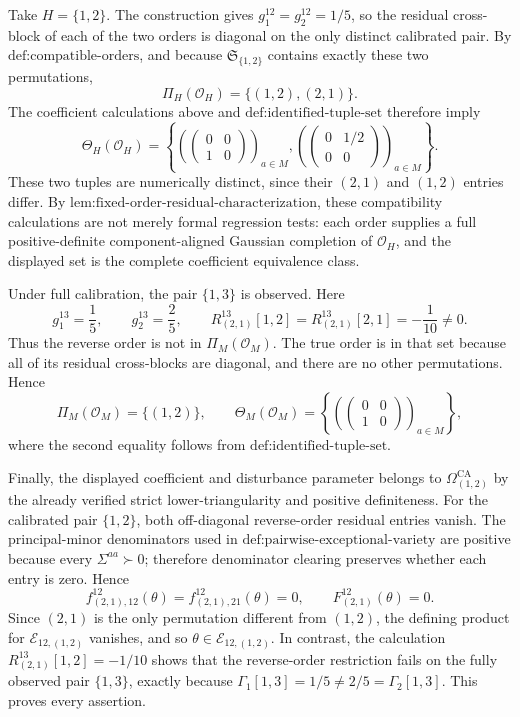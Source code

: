 Take \(H=\{1,2\}\).  The construction gives
\(g_1^{12}=g_2^{12}=1/5\), so the residual cross-block of each of the two orders is diagonal on the only distinct calibrated pair.  By \(\text{def:compatible-orders}\), and because \(\mathfrak S_{\{1,2\}}\) contains exactly these two permutations,
\[
\Pi_H(\mathcal O_H)=\{(1,2),(2,1)\}.
\]
The coefficient calculations above and \(\text{def:identified-tuple-set}\) therefore imply
\[
\Theta_H(\mathcal O_H)
=\left\{
\left(\begin{pmatrix}0&0\\1&0\end{pmatrix}\right)_{a\in M},
\left(\begin{pmatrix}0&1/2\\0&0\end{pmatrix}\right)_{a\in M}
\right\}.
\]
These two tuples are numerically distinct, since their \((2,1)\) and \((1,2)\) entries differ.  By \(\text{lem:fixed-order-residual-characterization}\), these compatibility calculations are not merely formal regression tests: each order supplies a full positive-definite component-aligned Gaussian completion of \(\mathcal O_H\), and the displayed set is the complete coefficient equivalence class.

Under full calibration, the pair \(\{1,3\}\) is observed.  Here
\[
g_1^{13}=\frac15,
\qquad
g_2^{13}=\frac25,
\qquad
R_{(2,1)}^{13}[1,2]
=R_{(2,1)}^{13}[2,1]
=-\frac1{10}\ne0.
\]
Thus the reverse order is not in \(\Pi_M(\mathcal O_M)\).  The true order is in that set because all of its residual cross-blocks are diagonal, and there are no other permutations.  Hence
\[
\Pi_M(\mathcal O_M)=\{(1,2)\},
\qquad
\Theta_M(\mathcal O_M)
=\left\{\left(\begin{pmatrix}0&0\\1&0\end{pmatrix}\right)_{a\in M}\right\},
\]
where the second equality follows from \(\text{def:identified-tuple-set}\).

Finally, the displayed coefficient and disturbance parameter belongs to
\(\Omega_{(1,2)}^{\mathrm{CA}}\) by the already verified strict lower-triangularity and positive definiteness.  For the calibrated pair \(\{1,2\}\), both off-diagonal reverse-order residual entries vanish.  The principal-minor denominators used in \(\text{def:pairwise-exceptional-variety}\) are positive because every \(\Sigma^{aa}\succ0\); therefore denominator clearing preserves whether each entry is zero.  Hence
\[
f_{(2,1),12}^{12}(\theta)=f_{(2,1),21}^{12}(\theta)=0,
\qquad
F_{(2,1)}^{12}(\theta)=0.
\]
Since \((2,1)\) is the only permutation different from \((1,2)\), the defining product for \(\mathcal E_{12,(1,2)}\) vanishes, and so \(\theta\in\mathcal E_{12,(1,2)}\).  In contrast, the calculation \(R_{(2,1)}^{13}[1,2]=-1/10\) shows that the reverse-order restriction fails on the fully observed pair \(\{1,3\}\), exactly because \(\Gamma_1[1,3]=1/5\ne2/5=\Gamma_2[1,3]\).  This proves every assertion.

